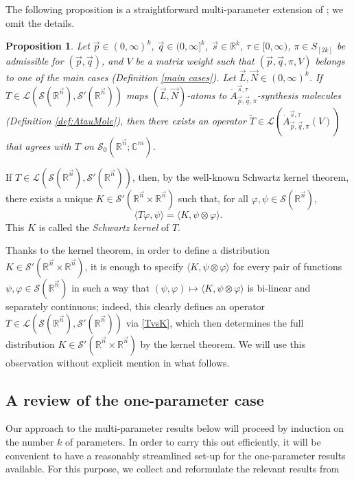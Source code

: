 \documentclass[11pt, reqno]{amsart}
\newtheorem{proposition}[theorem]{Proposition}
\theoremstyle{definition}
\theoremstyle{remark}
\numberwithin{equation}{section}
\newcommand{\R}{\mathbb R}
\newcommand{\vn}{\vec n}
\newcommand{\vp}{\vec p}
\newcommand{\vq}{\vec q}
\newcommand{\vs}{\vec s}
\newcommand{\pair}[2]{\langle #1, #2 \rangle}
\begin{document}
The following proposition is a straightforward multi-parameter extension of \cite[Proposition 6.5(i)]{BHYY:1c};
we omit the details.

\begin{proposition}\label{ext}
Let $\vp\in(0,\infty)^k$, $\vq\in(0,\infty]^k$, $\vs\in\R^k$, $\tau\in[0,\infty)$,
$\pi\in S_{[2k]}$ be admissible for $(\vp,\vq)$,
and $V$ be a matrix weight such that $(\vp,\vq,\pi,V)$ belongs
to one of the main cases (Definition \ref{main cases}).
Let $\vec L,\vec N\in(0,\infty)^k$.
If $T\in\mathcal L(\mathscr{S}(\mathbb R^{\vec n}),\mathscr{S}'(\mathbb R^{\vec n}))$
maps $(\vec L,\vec N)$-atoms to $\dot A^{\vec s,\tau}_{\vec p,\vec q,\pi}$-synthesis molecules (Definition \ref{def:AtauMole}),
then there exists an operator $\widetilde T\in\mathcal L(\dot A^{\vec s,\tau}_{\vec p,\vec q,\pi}(V))$ that agrees with $T$ on $\mathscr{S}_0(\mathbb R^{\vec n};\mathbb C^m)$.
\end{proposition}

If $T\in\mathcal L(\mathscr S(\R^{\vn}),\mathscr S'(\R^{\vn}))$,
then, by the well-known Schwartz kernel theorem,
there exists a unique $K\in\mathscr S'
(\mathbb R^{\vn}\times\mathbb R^{\vn})$
such that, for all $\varphi,\psi\in\mathscr S(\R^{\vn})$,
\begin{equation}\label{TvsK}
  \pair{T\varphi}{\psi}=\pair{K}{\psi\otimes\varphi}.
\end{equation}
This $K$ is called the \emph{Schwartz kernel} of $T$.

Thanks to the kernel theorem, in order to define a distribution $K\in\mathscr S'
(\mathbb R^{\vn}\times\mathbb R^{\vn})$, it is enough to specify $\pair{K}{\psi\otimes\varphi}$ for every pair of functions $\psi,\varphi\in\mathscr S(\R^{\vn})$ in such a way that $(\psi,\varphi)\mapsto \pair{K}{\psi\otimes\varphi}$ is bi-linear and separately continuous; indeed, this clearly defines an operator $T\in\mathcal L(\mathscr S(\R^{\vn}),\mathscr S'(\R^{\vn}))$ via \eqref{TvsK}, which then determines the full distribution $K\in\mathscr S'
(\mathbb R^{\vn}\times\mathbb R^{\vn})$ by the kernel theorem. We will use this observation without explicit mention in what follows.

\subsection{A review of the one-parameter case}\label{CZop}

Our approach to the multi-parameter results below will proceed by induction on the number $k$ of parameters. In order to carry this out efficiently, it will be convenient to have a reasonably streamlined set-up for the one-parameter results available. For this purpose, we collect and reformulate the relevant results from \cite[Sections 6.2--6.3]{BHYY:1c}
\end{document}
